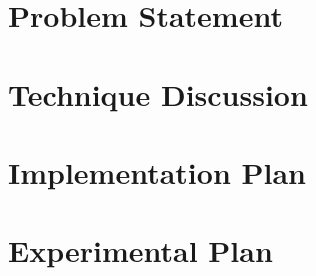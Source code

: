 \section{Problem Statement}



\section{Technique Discussion}



\section{Implementation Plan}



\section{Experimental Plan}

